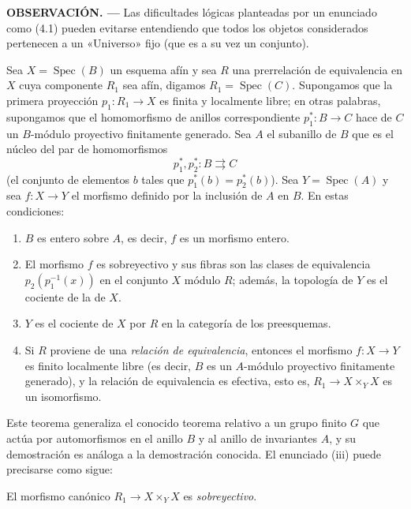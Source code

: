 \medskip
\noindent\textbf{OBSERVACIÓN. ---} Las dificultades lógicas planteadas por un
enunciado como (4.1) pueden evitarse entendiendo que todos los objetos
considerados pertenecen a un «Universo» fijo (que es a su vez un conjunto).


 Sea $X=\operatorname{Spec}(B)$ un esquema afín y sea
$R$ una prerrelación de equivalencia en $X$ cuya componente $R_1$ sea afín,
digamos $R_1=\operatorname{Spec}(C)$. Supongamos que la primera proyección
$p_1:R_1\to X$ es finita y localmente libre; en otras palabras, supongamos
que el homomorfismo de anillos correspondiente $p_1^*:B\to C$ hace de $C$ un
$B$-módulo proyectivo finitamente generado. Sea $A$ el subanillo de $B$ que
es el núcleo del par de homomorfismos
\[
  p_1^*,p_2^*:B\rightrightarrows C
\]
(el conjunto de elementos $b$ tales que $p_1^*(b)=p_2^*(b)$). Sea
$Y=\operatorname{Spec}(A)$ y sea $f:X\to Y$ el morfismo definido por la
inclusión de $A$ en $B$. En estas condiciones:
\begin{enumerate}
\item[(i)] $B$ es entero sobre $A$, es decir, $f$ es un morfismo entero.

\item[(ii)] El morfismo $f$ es sobreyectivo y sus fibras son las clases de
equivalencia
$p_2(p_1^{-1}(x))$ en el conjunto $X$ módulo $R$; además, la topología de $Y$
es el cociente de la de $X$.

\item[(iii)] $Y$ es el cociente de $X$ por $R$ en la categoría de los
preesquemas.

\item[(iv)] Si $R$ proviene de una \emph{relación de equivalencia}, entonces
el morfismo $f:X\to Y$ es finito localmente libre (es decir, $B$ es un
$A$-módulo proyectivo finitamente generado), y la relación de equivalencia es
efectiva, esto es, $R_1\to X\times_Y X$ es un isomorfismo.
\end{enumerate}

Este teorema generaliza el conocido teorema relativo a un grupo finito $G$ que
actúa por automorfismos en el anillo $B$ y al anillo de invariantes $A$, y su
demostración es análoga a la demostración conocida. El enunciado (iii) puede
precisarse como sigue:

 El morfismo canónico
$R_1\to X\times_Y X$ es \emph{sobreyectivo}.

